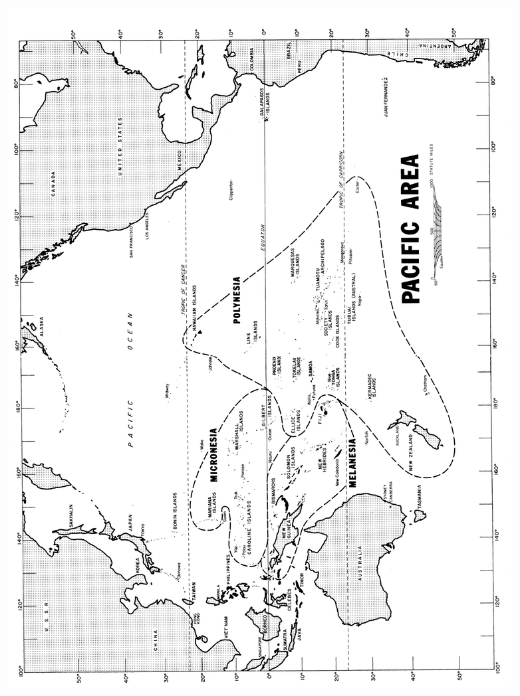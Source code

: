 \documentclass[12pt]{report}
\begin{document}
\noindent\includegraphics[height=8.5in]{oceania600.pdf}


\tableofcontents
















\nocite{*}


\end{document}
